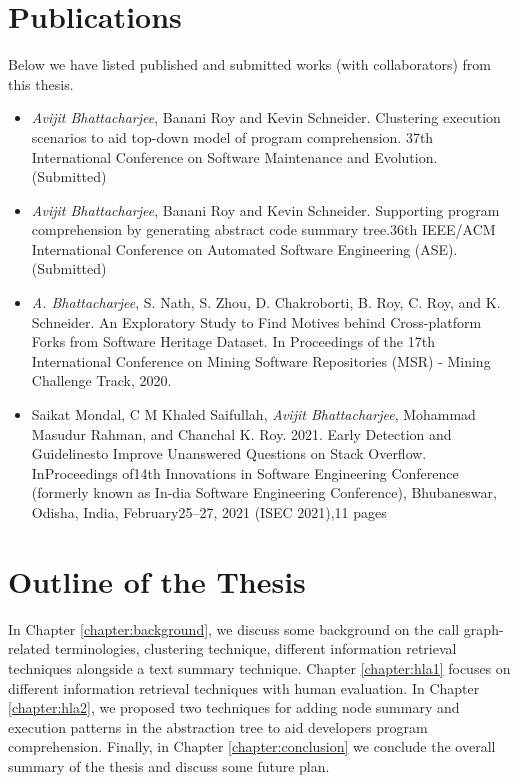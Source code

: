 
\section{Publications}

Below we have listed published and submitted works (with collaborators) from this thesis. 

\begin{itemize}
    \item \emph{Avijit Bhattacharjee}, Banani Roy and Kevin Schneider. Clustering execution scenarios to aid top-down
model of program comprehension. 37th International Conference on Software Maintenance and Evolution. (Submitted)
    \item \emph{Avijit Bhattacharjee}, Banani Roy and Kevin Schneider. Supporting program comprehension by generating abstract code summary tree.36th IEEE/ACM International Conference on Automated Software Engineering (ASE). (Submitted)
    \item \emph{A. Bhattacharjee}, S. Nath, S. Zhou, D. Chakroborti, B. Roy, C. Roy, and K. Schneider. An Exploratory Study to Find Motives behind Cross-platform Forks from Software Heritage Dataset. In Proceedings of the 17th International Conference on Mining Software Repositories (MSR) - Mining Challenge Track, 2020.
    \item Saikat Mondal, C M Khaled Saifullah, \emph{Avijit Bhattacharjee}, Mohammad Masudur Rahman, and Chanchal K. Roy. 2021. Early Detection and Guidelinesto Improve Unanswered Questions on Stack Overflow. InProceedings of14th Innovations in Software Engineering Conference (formerly known as In-dia Software Engineering Conference), Bhubaneswar, Odisha, India, February25–27, 2021 (ISEC 2021),11 pages
    
    
\end{itemize}

\section{Outline of the Thesis}
\label{intro:outline}

In Chapter \ref{chapter:background}, we discuss some background on the call graph-related terminologies, clustering technique, different information retrieval techniques alongside a text summary technique. Chapter \ref{chapter:hla1} focuses on different information retrieval techniques with human evaluation. In Chapter \ref{chapter:hla2}, we proposed two techniques for adding node summary and execution patterns in the abstraction tree to aid developers program comprehension. Finally, in Chapter \ref{chapter:conclusion} we conclude the overall summary of the thesis and discuss some future plan. 